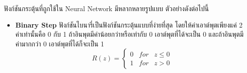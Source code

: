 ฟังก์ชันกระตุ้นที่ถูกใช้ใน Neural Network มีหลากหลายรูปแบบ ตัวอย่างดังต่อไปนี้

\begin{itemize}
    \item \textbf{Binary Step} ฟังก์ชันไบนารี่เป็นฟังก์ชันกระตุ้นแบบที่ง่ายที่สุด โดยให้ค่าเอาต์พุตเพียงแค่ 2 ค่าเท่านั้นคือ 0 กับ 1
    ถ้าอินพุตมีค่าน้อยกว่าหรือเท่ากับ 0 เอาต์พุตที่ได้จะเป็น 0 และถ้าอินพุตมีค่ามากกว่า 0 เอาต์พุตที่ได้ก็จะเป็น 1
    \begin{equation}
        R(z) = \left\{
            \begin{array}{lll}
                0 & for & z \leq 0  \\
                1 & for & z > 0
            \end{array}
        \right.
    \end{equation}


\end{itemize}
